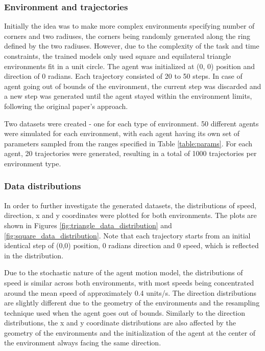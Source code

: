 \documentclass{article}
\begin{document}
\subsubsection{Environment and trajectories}
Initially the idea was to make more complex environments specifying number of corners and two radiuses, the corners being randomly generated along the ring defined by the two radiuses. However, due to the complexity of the task and time constraints, the trained models only used square and equilateral triangle environments fit in a unit circle. The agent was initialized at (0, 0) position and direction of 0 radians. Each trajectory consisted of 20 to 50 steps.  In case of agent going out of bounds of the environment, the current step was discarded and a new step was generated until the agent stayed within the environment limits, following the original paper's approach. 

Two datasets were created - one for each type of environment. 50 different agents were simulated for each environment, with each agent having its own set of parameters sampled from the ranges specified in Table \ref{table:params}. For each agent, 20 trajectories were generated, resulting in a total of 1000 trajectories per environment type. 

\subsubsection{Data distributions}
In order to further investigate the generated datasets, the distributions of speed, direction, x and y coordinates were plotted for both environments. The plots are shown in Figures \ref{fig:triangle_data_distribution} and \ref{fig:square_data_distribution}. Note that each trajectory starts from an initial identical step of (0,0) position, 0 radians direction and 0 speed, which is reflected in the distribution.

Due to the stochastic nature of the agent motion model, the distributions of speed is similar across both environments, with most speeds being concentrated around the mean speed of approximately 0.4 units/s. The direction distributions are slightly different due to the geometry of the environments and the resampling technique used when the agent goes out of bounds. Similarly to the direction distributions, the x and y coordinate distributions are also affected by the geometry of the environments and the initialization of the agent at the center of the environment always facing the same direction. 
\end{document}
